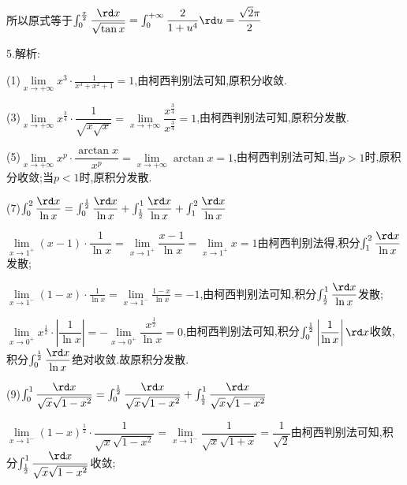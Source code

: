 所以原式等于$\int_0^{\frac{\pi }{2}} {\dfrac{{\rd x}}{{\sqrt {\tan x} }}}  = \int_0^{ + \infty } {\dfrac{2}{{1 + {u^4}}}} \rd u = \dfrac{{\sqrt 2 \pi }}{2}$

5.解析:

(1)$\mathop {\lim }\limits_{x \to  + \infty } {x^3} \cdot \frac{1}{{{x^3} + {x^2} + 1}} = 1$,由柯西判别法可知,原积分收敛.

(3)$\mathop {\lim }\limits_{x \to  + \infty } {x^{\frac{3}{4}}} \cdot \dfrac{1}{{\sqrt {x\sqrt x } }} = \mathop {\lim }\limits_{x \to  + \infty } \dfrac{{{x^{\frac{3}{4}}}}}{{{x^{\frac{3}{4}}}}} = 1$,由柯西判别法可知,原积分发散.

(5)$\mathop {\lim }\limits_{x \to  + \infty } {x^p} \cdot \dfrac{{\arctan x}}{{{x^p}}} = \mathop {\lim }\limits_{x \to  + \infty } \arctan x = 1$,由柯西判别法可知,当$p > 1$时,原积分收敛;当$p < 1$时,原积分发散.

(7)$\int_0^2 {\dfrac{{\rd x}}{{\ln x}}}  = \int_0^{\frac{1}{2}} {\dfrac{{\rd x}}{{\ln x}}}  + \int_{\frac{1}{2}}^1 {\dfrac{{\rd x}}{{\ln x}}}  + \int_1^2 {\dfrac{{\rd x}}{{\ln x}}} $

$\mathop {\lim }\limits_{x \to {1^ + }} (x - 1) \cdot \dfrac{1}{{\ln x}} = \mathop {\lim }\limits_{x \to {1^ + }} \dfrac{{x - 1}}{{\ln x}} = \mathop {\lim }\limits_{x \to {1^ + }} x = 1$由柯西判别法得,积分$\int_1^2 {\dfrac{{\rd x}}{{\ln x}}} $发散;

$\mathop {\lim }\limits_{x \to {1^ - }} (1 - x) \cdot \frac{1}{{\ln x}} = \mathop {\lim }\limits_{x \to {1^ - }} \frac{{1 - x}}{{\ln x}} =  - 1$,由柯西判别法可知,积分$\int_{\frac{1}{2}}^1 {\dfrac{{\rd x}}{{\ln x}}} $发散;

$\mathop {\lim }\limits_{x \to {0^ + }} {x^{\frac{1}{2}}} \cdot \left| {\dfrac{1}{{\ln x}}} \right| =  - \mathop {\lim }\limits_{x \to {0^ + }} \dfrac{{{x^{\frac{1}{2}}}}}{{\ln x}} = 0$,由柯西判别法可知,积分$\int_0^{\frac{1}{2}} {\left| {\dfrac{1}{{\ln x}}} \right|\rd x} $收敛,积分$\int_0^{\frac{1}{2}} {\dfrac{{\rd x}}{{\ln x}}} $绝对收敛.故原积分发散.

(9)$\int_0^1 {\dfrac{{\rd x}}{{\sqrt x \sqrt {1 - {x^2}} }}}  = \int_0^{\frac{1}{2}} {\dfrac{{\rd x}}{{\sqrt x \sqrt {1 - {x^2}} }}}  + \int_{\frac{1}{2}}^1 {\dfrac{{\rd x}}{{\sqrt x \sqrt {1 - {x^2}} }}} $

$\mathop {\lim }\limits_{x \to {1^ - }} {(1 - x)^{\frac{1}{2}}} \cdot \dfrac{1}{{\sqrt x \sqrt {1 - {x^2}} }} = \mathop {\lim }\limits_{x \to {1^ - }} \dfrac{1}{{\sqrt x \sqrt {1 + x} }} = \dfrac{1}{{\sqrt 2 }}$由柯西判别法可知,积分$\int_{\frac{1}{2}}^1 {\dfrac{{\rd x}}{{\sqrt x \sqrt {1 - {x^2}} }}} $收敛;

